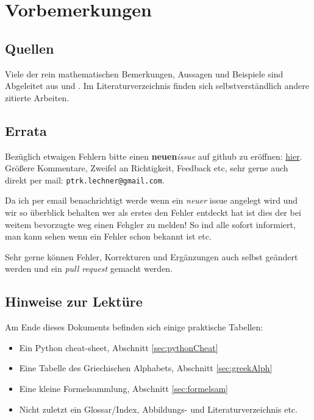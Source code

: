 \chapter*{Vorbemerkungen}

\section*{Quellen}

Viele der rein mathematischen Bemerkungen, Aussagen und Beispiele sind Abgeleitet aus \cite{merziger2024repetitorium} und \cite{gollmann2017mathematik}. Im Literaturverzeichnis finden sich selbstverständlich andere zitierte Arbeiten.

\section*{Errata}

Bezüglich etwaigen Fehlern bitte einen \textbf{neuen}\emph{issue} auf github zu eröffnen: \href{https://github.com/hrtlacek/matheFuerTonmeisterinnen/issues}{hier}. Größere Kommentare, Zweifel an Richtigkeit, Feedback etc, sehr gerne auch direkt per mail: \texttt{ptrk.lechner@gmail.com}.

Da ich per email benachrichtigt werde wenn ein \emph{neuer} issue angelegt wird und wir so überblick behalten wer als erstes den Fehler entdeckt hat ist dies der bei weitem bevorzugte weg einen Fehgler zu melden! So ind alle sofort informiert, man kann sehen wenn ein Fehler schon bekannt ist etc.

Sehr gerne können Fehler, Korrekturen und Ergänzungen auch selbst geändert werden und ein \emph{pull request} gemacht werden.

\section*{Hinweise zur Lektüre}

Am Ende dieses Dokuments befinden sich einige praktische Tabellen:
\begin{itemize}
\item Ein Python cheat-sheet, Abschnitt \ref{sec:pythonCheat}
\item Eine Tabelle des Griechischen Alphabets, Abschnitt \ref{sec:greekAlph}
\item Eine kleine Formelsammlung, Abschnitt \ref{sec:formelsam}
\item Nicht zuletzt ein Glossar/Index, Abbildungs- und Literaturverzeichnis etc.
\end{itemize} 

